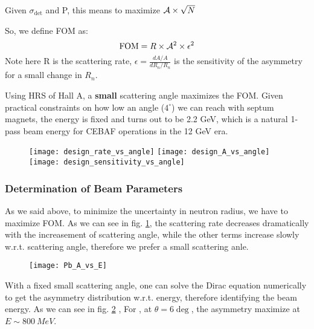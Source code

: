 Given $\sigma_{\text{det}}$ and P, this means to maximize $\mathcal{A} \times \sqrt{N}$

So, we define FOM as:
\begin{equation*}
    \text{FOM} = R \times \mathcal{A}^2 \times \epsilon^2
\end{equation*}
Note here R is the scattering rate, $\epsilon = \frac{dA/A}{dR_n/R_n}$ is the sensitivity of the asymmetry for a small change in $R_n$.

\bigskip
Using HRS of Hall A, a \textbf{small} scattering angle maximizes the FOM. 
Given practical constraints on how low an angle ($4^\circ$) we can reach with 
septum magnets, the energy is fixed and turns out to be 2.2 GeV, which is a 
natural 1-pass beam energy for CEBAF operations in the 12 GeV era.

\begin{figure}[h!]
    \texttt{[image: design\_rate\_vs\_angle]}
    \texttt{[image: design\_A\_vs\_angle]}
    \texttt{[image: design\_sensitivity\_vs\_angle]}
    \label{fig:FOM}
\end{figure}

\subsubsection{Determination of Beam Parameters}
As we said above, to minimize the uncertainty in neutron radius, we have to 
maximize FOM. As we can see in fig. \ref{fig:FOM}, the scattering rate decreases
dramatically with the increasement of scattering angle, while the other terms
increase slowly w.r.t. scattering angle, therefore we prefer a small scattering
anle.

\begin{figure}[h!]
    \texttt{[image: Pb\_A\_vs\_E]}
    \label{fig:Pb_A_vs_E}
\end{figure}
With a fixed small scattering angle, one can solve the Dirac equation numerically
to get the asymmetry distribution w.r.t. energy, therefore identifying the 
beam energy. As we can see in fig. \ref{fig:Pb_A_vs_E} \cite{PhysRevC.57.3430}, 
For \Pb, at $\theta = 6\deg$, the asymmetry maximize at $E \sim 800 \ MeV$.

